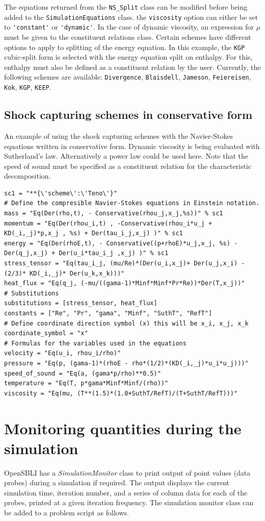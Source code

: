 \documentclass[11pt]{article}
\begin{document}
The equations returned from the \verb|NS_Split| class can be modified before being added to the \verb|SimulationEquations| class. the \verb|viscosity| option can either be set to \verb|'constant'| or \verb|'dynamic'|. In the case of dynamic viscosity, an expression for $\mu$ must be given to the constituent relations class. Certain schemes have different options to apply to splitting of the energy equation. In this example, the \verb|KGP| cubic-split form is selected with the energy equation split on enthalpy. For this, enthalpy must also be defined as a constituent relation by the user. Currently, the following schemes are available: \verb|Divergence|, \verb|Blaisdell|, \verb|Jameson|, \verb|Feiereisen|, \verb|Kok|, \verb|KGP|, \verb|KEEP|. 

\subsection{Shock capturing schemes in conservative form}
An example of using the shock capturing schemes with the Navier-Stokes equations written in conservative form. Dynamic viscosity is being evaluated with Sutherland's law. Alternatively a power law could be used here. Note that the speed of sound must be specified as a constituent relation for the characteristic decomposition.
\begin{lstlisting}
sc1 = "**{\'scheme\':\'Teno\'}"
# Define the compresible Navier-Stokes equations in Einstein notation.
mass = "Eq(Der(rho,t), - Conservative(rhou_j,x_j,%s))" % sc1
momentum = "Eq(Der(rhou_i,t) , -Conservative(rhou_i*u_j + KD(_i,_j)*p,x_j , %s) + Der(tau_i_j,x_j) )" % sc1
energy = "Eq(Der(rhoE,t), - Conservative((p+rhoE)*u_j,x_j, %s) - Der(q_j,x_j) + Der(u_i*tau_i_j ,x_j) )" % sc1
stress_tensor = "Eq(tau_i_j, (mu/Re)*(Der(u_i,x_j)+ Der(u_j,x_i) - (2/3)* KD(_i,_j)* Der(u_k,x_k)))"
heat_flux = "Eq(q_j, (-mu/((gama-1)*Minf*Minf*Pr*Re))*Der(T,x_j))"
# Substitutions
substitutions = [stress_tensor, heat_flux]
constants = ["Re", "Pr", "gama", "Minf", "SuthT", "RefT"]
# Define coordinate direction symbol (x) this will be x_i, x_j, x_k
coordinate_symbol = "x"
# Formulas for the variables used in the equations
velocity = "Eq(u_i, rhou_i/rho)"
pressure = "Eq(p, (gama-1)*(rhoE - rho*(1/2)*(KD(_i,_j)*u_i*u_j)))"
speed_of_sound = "Eq(a, (gama*p/rho)**0.5)"
temperature = "Eq(T, p*gama*Minf*Minf/(rho))"
viscosity = "Eq(mu, (T**(1.5)*(1.0+SuthT/RefT)/(T+SuthT/RefT)))"
\end{lstlisting}

\newpage
\section{Monitoring quantities during the simulation}
OpenSBLI has a \textit{SimulationMonitor} class to print output of point values (data probes) during a simulation if required. The output displays the current simulation time, iteration number, and a series of column data for each of the probes, printed at a given iteration frequency. The simulation monitor class can be added to a problem script as follows.
\end{document}

